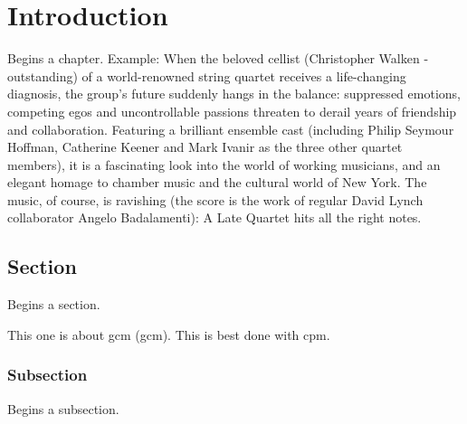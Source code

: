 \let\textcircled=\pgftextcircled
\chapter{Introduction}
\label{chap:intro}

Begins a chapter. Example: When the beloved cellist (Christopher Walken - outstanding) of a world-renowned string quartet receives a life-changing diagnosis, the group's future suddenly hangs in the balance: suppressed emotions, competing egos and uncontrollable passions threaten to derail years of friendship and collaboration. Featuring a brilliant ensemble cast (including Philip Seymour Hoffman, Catherine Keener and Mark Ivanir as the three other quartet members), it is a fascinating look into the world of working musicians, and an elegant homage to chamber music and the cultural world of New York. The music, of course, is ravishing (the score is the work of regular David Lynch collaborator Angelo Badalamenti): A Late Quartet hits all the right notes.

\section{Section}
\label{sec:sec01}

Begins a section.

This one is about \acrlong{gcm} (\acrshort{gcm}). This is best done with \acrfull{cpm}.

\subsection{Subsection}
\label{subsec:subsec01}

Begins a subsection.

